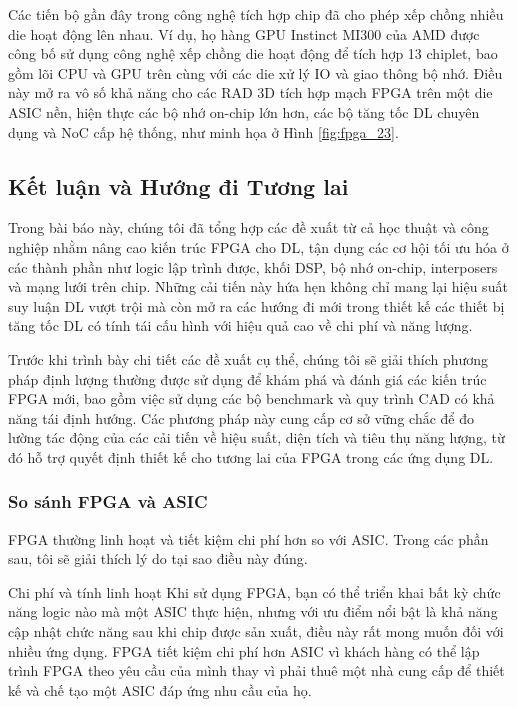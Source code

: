 \documentclass[a4paper]{article}
\begin{document}
Các tiến bộ gần đây trong công nghệ tích hợp chip đã cho phép xếp chồng nhiều die hoạt động lên nhau. Ví dụ, họ hàng GPU Instinct MI300 của AMD được công bố sử dụng công nghệ xếp chồng die hoạt động để tích hợp 13 chiplet, bao gồm lõi CPU và GPU trên cùng với các die xử lý IO và giao thông bộ nhớ. Điều này mở ra vô số khả năng cho các RAD 3D tích hợp mạch FPGA trên một die ASIC nền, hiện thực các bộ nhớ on-chip lớn hơn, các bộ tăng tốc DL chuyên dụng và NoC cấp hệ thống, như minh họa ở Hình \ref{fig:fpga_23}.

\subsection{Kết luận và Hướng đi Tương lai}

Trong bài báo này, chúng tôi đã tổng hợp các đề xuất từ cả học thuật và công nghiệp nhằm nâng cao kiến trúc FPGA cho DL, tận dụng các cơ hội tối ưu hóa ở các thành phần như logic lập trình được, khối DSP, bộ nhớ on-chip, interposers và mạng lưới trên chip. Những cải tiến này hứa hẹn không chỉ mang lại hiệu suất suy luận DL vượt trội mà còn mở ra các hướng đi mới trong thiết kế các thiết bị tăng tốc DL có tính tái cấu hình với hiệu quả cao về chi phí và năng lượng.

Trước khi trình bày chi tiết các đề xuất cụ thể, chúng tôi sẽ giải thích phương pháp định lượng thường được sử dụng để khám phá và đánh giá các kiến trúc FPGA mới, bao gồm việc sử dụng các bộ benchmark và quy trình CAD có khả năng tái định hướng. Các phương pháp này cung cấp cơ sở vững chắc để đo lường tác động của các cải tiến về hiệu suất, diện tích và tiêu thụ năng lượng, từ đó hỗ trợ quyết định thiết kế cho tương lai của FPGA trong các ứng dụng DL.


\subsubsection{So sánh FPGA và ASIC}
FPGA thường linh hoạt và tiết kiệm chi phí hơn so với ASIC. Trong các phần sau, tôi sẽ giải thích lý do tại sao điều này đúng.

Chi phí và tính linh hoạt
Khi sử dụng FPGA, bạn có thể triển khai bất kỳ chức năng logic nào mà một ASIC thực hiện, nhưng với ưu điểm nổi bật là khả năng cập nhật chức năng sau khi chip được sản xuất, điều này rất mong muốn đối với nhiều ứng dụng. FPGA tiết kiệm chi phí hơn ASIC vì khách hàng có thể lập trình FPGA theo yêu cầu của mình thay vì phải thuê một nhà cung cấp để thiết kế và chế tạo một ASIC đáp ứng nhu cầu của họ.
\end{document}
